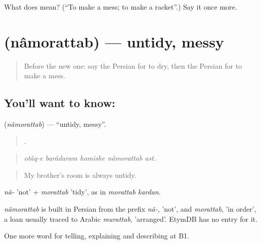 \begin{tcolorbox}[breakable,colback=teal!4,colframe=teal!35!black,title={Before you move on}]
What does   mean? (\textquotedblleft{}To make a mess; to make a racket\textquotedblright{}.) Say it once more.
\end{tcolorbox}
\section[\texorpdfstring{\fa{نامرتب} (nâmorattab)}{نامرتب (nâmorattab)}]{ (nâmorattab) — untidy, messy}

\label{lesson:FA-C536-namorattab}



\begin{quote}
Before the new one: say the Persian for to dry, then the Persian for to make a mess.
\end{quote}

\subsection*{You'll want to know: }
\textbf{} (\emph{nâmorattab}) — \textquotedblleft{}untidy, messy\textquotedblright{}.

\begin{quote}
    .
\end{quote}

\begin{quote}
\emph{otâq-e barâdaram hamishe nâmorattab ast.}
\end{quote}

\begin{quote}
My brother's room is always untidy.
\end{quote}

\emph{nâ-} 'not' + \emph{morattab} 'tidy', as in \emph{morattab kardan}.

\begin{cousinweb}
\emph{nâmorattab} is built in Persian from the prefix \emph{nâ-}, 'not', and \emph{morattab}, 'in order', a loan usually traced to Arabic \emph{murattab}, 'arranged'. EtymDB has no entry for it.
\end{cousinweb}

\begin{grammarlens}[title={What you've built}]
One more word for telling, explaining and describing at B1.
\end{grammarlens}

